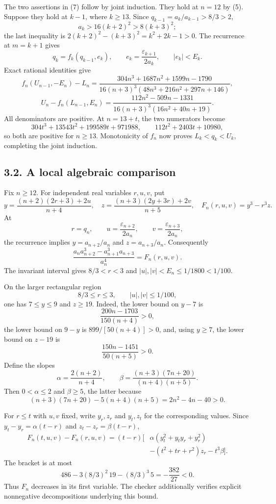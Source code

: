 \documentclass[
  11pt,
  a4paper,
]{article}
\begin{document}
The two assertions in (7) follow by joint induction. They hold at
\(n=12\) by (5). Suppose they hold at \(k-1\), where \(k\ge13\). Since
\(q_{k-1}=a_k/a_{k-1}>8/3>2\), \[
a_k>16(k+2)^2>8(k+3)^2;
\] the last inequality is \(2(k+2)^2-(k+3)^2=k^2+2k-1>0\). The
recurrence at \(m=k+1\) gives \[
q_k=f_k(q_{k-1},e_k),\qquad e_k=\frac{\varepsilon_{k+1}}{2a_k},
\qquad |e_k|<E_k.
\] Exact rational identities give \[
f_n(U_{n-1},-E_n)-L_n
=\frac{304n^3+1687n^2+1599n-1790}
{16(n+3)^3(48n^3+216n^2+297n+146)},
\tag{13}
\] \[
U_n-f_n(L_{n-1},E_n)
=\frac{112n^2-509n-1331}
{16(n+3)^3(16n^2+40n+19)}.
\tag{14}
\] All denominators are positive. At \(n=13+t\), the two numerators
become \[
304t^3+13543t^2+199589t+971988,
\qquad112t^2+2403t+10980,
\] so both are positive for \(n\ge13\). Monotonicity of \(f_n\) now
proves \(L_k<q_k<U_k\), completing the joint induction.

\subsection{3.2. A local algebraic
comparison}\label{a-local-algebraic-comparison}

Fix \(n\ge12\). For independent real variables \(r,u,v\), put \[
y=\frac{(n+2)(2r+3)+2u}{n+4},\quad
z=\frac{(n+3)(2y+3r)+2v}{n+5},\quad
F_n(r,u,v)=y^3-r^3z.
\tag{15}
\] At \[
r=q_n,\qquad u=\frac{\varepsilon_{n+2}}{2a_n},\qquad
v=\frac{\varepsilon_{n+3}}{2a_n},
\] the recurrence implies \(y=a_{n+2}/a_n\) and \(z=a_{n+3}/a_n\).
Consequently \[
\frac{a_na_{n+2}^3-a_{n+1}^3a_{n+3}}{a_n^4}=F_n(r,u,v).
\tag{16}
\] The invariant interval gives \(8/3<r<3\) and
\(|u|,|v|<E_n\le1/1800<1/100\).

On the larger rectangular region \[
8/3\le r\le3,\qquad |u|,|v|\le1/100,
\tag{17}
\] one has \(7\le y\le9\) and \(z\ge19\). Indeed, the lower bound on
\(y-7\) is \[
\frac{200n-1703}{150(n+4)}>0,
\] the lower bound on \(9-y\) is \(899/[50(n+4)]>0\), and, using
\(y\ge7\), the lower bound on \(z-19\) is \[
\frac{150n-1451}{50(n+5)}>0.
\] Define the slopes \[
\alpha=\frac{2(n+2)}{n+4},\qquad
\beta=\frac{(n+3)(7n+20)}{(n+4)(n+5)}.
\] Then \(0<\alpha\le2\) and \(\beta\ge5\), the latter because \[
(n+3)(7n+20)-5(n+4)(n+5)=2n^2-4n-40>0.
\]

For \(r\le t\) with \(u,v\) fixed, write \(y_r,z_r\) and \(y_t,z_t\) for
the corresponding values. Since \(y_t-y_r=\alpha(t-r)\) and
\(z_t-z_r=\beta(t-r)\), \[
\begin{aligned}
F_n(t,u,v)-F_n(r,u,v)
=(t-r)\bigl[&\alpha(y_t^2+y_ty_r+y_r^2)\\
&-(t^2+tr+r^2)z_r-t^3\beta\bigr].
\end{aligned}
\tag{18}
\] The bracket is at most \[
486-3(8/3)^2\,19-(8/3)^3\,5=-\frac{382}{27}<0.
\] Thus \(F_n\) decreases in its first variable. The checker
additionally verifies explicit nonnegative decompositions underlying
this bound.
\end{document}
